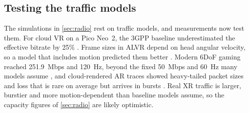 \subsection{Testing the traffic models}
The simulations in \cref{sec:radio} rest on traffic models, and measurements now test them. For cloud VR on
a Pico Neo~2, the 3GPP baseline underestimated the effective bitrate by 25\% \cite{W4399340506}. Frame
sizes in ALVR depend on head angular velocity, so a model that includes motion predicted them better
\cite{W4414539403}. Modern 6DoF gaming reached 251.9~Mbps and 120~Hz, beyond the fixed 50~Mbps and 60~Hz
many models assume \cite{W4411688686}, and cloud-rendered AR traces showed heavy-tailed packet sizes and
loss that is rare on average but arrives in bursts \cite{W7202080971}. Real XR traffic is larger, burstier and more motion-dependent than baseline models assume, so
the capacity figures of \cref{sec:radio} are likely optimistic.
